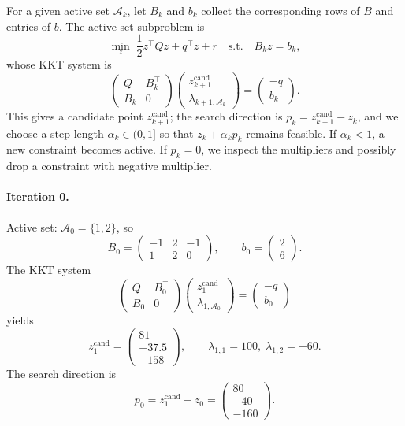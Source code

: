 \documentclass[11pt]{article}
\begin{document}
For a given active set \(\mathcal{A}_k\), let \(B_k\) and \(b_k\) collect the
corresponding rows of \(B\) and entries of \(b\). The active-set subproblem is
\[
\min_{z} \;\frac12 z^\top Q z + q^\top z + r
\quad\text{s.t.}\quad B_k z = b_k,
\]
whose KKT system is
\[
\begin{pmatrix}
Q & B_k^\top\\
B_k & 0
\end{pmatrix}
\begin{pmatrix}
z_{k+1}^{\text{cand}}\\[0.2em] \lambda_{k+1,\mathcal{A}_k}
\end{pmatrix}
=
\begin{pmatrix}
-q\\[0.2em] b_k
\end{pmatrix}.
\]
This gives a candidate point \(z_{k+1}^{\text{cand}}\); the search direction is
\(
p_k = z_{k+1}^{\text{cand}} - z_k
\),
and we choose a step length \(\alpha_k\in(0,1]\) so that
\(z_k + \alpha_k p_k\) remains feasible. If \(\alpha_k < 1\), a new constraint
becomes active. If \(p_k = 0\), we inspect the multipliers and possibly drop a
constraint with negative multiplier.

\paragraph{Iteration 0.}
Active set: \(\mathcal{A}_0 = \{1,2\}\), so
\[
B_0 = \begin{pmatrix}
-1 & 2 & -1\\
 1 & 2 &  0
\end{pmatrix},\qquad
b_0 = \begin{pmatrix}2\\6\end{pmatrix}.
\]
The KKT system
\[
\begin{pmatrix}
Q & B_0^\top\\
B_0 & 0
\end{pmatrix}
\begin{pmatrix}
z_1^{\text{cand}}\\ \lambda_{1,\mathcal{A}_0}
\end{pmatrix}
=
\begin{pmatrix}
-q\\ b_0
\end{pmatrix}
\]
yields
\[
z_1^{\text{cand}} = \begin{pmatrix}81\\[0.1em]-37.5\\[0.1em]-158\end{pmatrix},
\qquad
\lambda_{1,1} = 100,\;\lambda_{1,2} = -60.
\]
The search direction is
\[
p_0 = z_1^{\text{cand}} - z_0
    = \begin{pmatrix}80\\[0.1em]-40\\[0.1em]-160\end{pmatrix}.
\]
\end{document}
